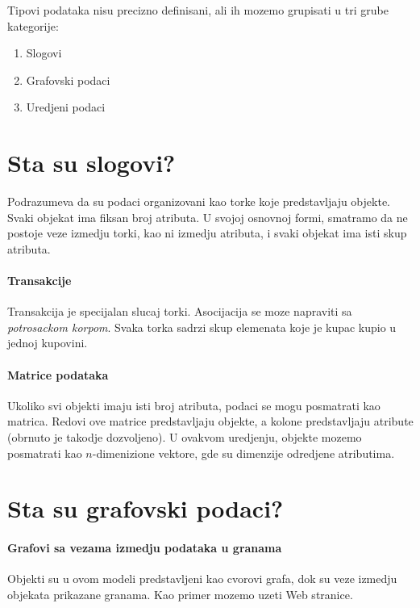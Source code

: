 \documentclass[a4paper]{article}
\begin{document}
Tipovi podataka nisu precizno definisani, ali ih mozemo grupisati u tri grube kategorije:

\begin{enumerate}
    \item Slogovi
    \item Grafovski podaci
    \item Uredjeni podaci
\end{enumerate}

\section{Sta su slogovi?}

Podrazumeva da su podaci organizovani kao torke koje predstavljaju objekte. Svaki objekat ima fiksan
broj atributa. U svojoj osnovnoj formi, smatramo da ne postoje veze izmedju torki, kao ni izmedju
atributa, i svaki objekat ima isti skup atributa.

\paragraph{Transakcije}

Transakcija je specijalan slucaj torki. Asocijacija se moze napraviti sa \emph{potrosackom korpom}.
Svaka torka sadrzi skup elemenata koje je kupac kupio u jednoj kupovini.

\paragraph{Matrice podataka}

Ukoliko svi objekti imaju isti broj atributa, podaci se mogu posmatrati kao matrica. Redovi ove
matrice predstavljaju objekte, a kolone predstavljaju atribute (obrnuto je takodje dozvoljeno). U
ovakvom uredjenju, objekte mozemo posmatrati kao \(n\)-dimenizione vektore, gde su
dimenzije odredjene atributima.

\section{Sta su grafovski podaci?}

\paragraph{Grafovi sa vezama izmedju podataka u granama}

Objekti su u ovom modeli predstavljeni kao cvorovi grafa, dok su veze izmedju objekata prikazane
granama. Kao primer mozemo uzeti Web stranice.
\end{document}
